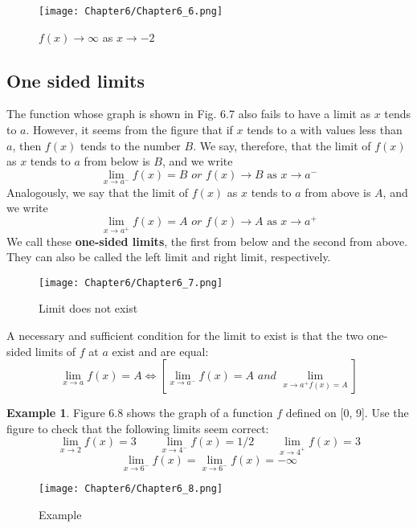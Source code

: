 \documentclass[10pt,a4paper]{book}
\theoremstyle{definition}\newtheorem{definition}{Definition}
\theoremstyle{definition}\newtheorem{fact}{Fact}
\theoremstyle{definition}\newtheorem{ex}{Ex.}
\theoremstyle{definition}\newtheorem{project}{Project}
\theoremstyle{definition}\newtheorem{problem}{Problem}
\theoremstyle{definition}\newtheorem{example}{Example}
\numberwithin{theorem}{chapter}
\numberwithin{corollary}{chapter}
\numberwithin{assumption}{chapter}
\numberwithin{definition}{chapter}
\numberwithin{prop}{chapter}
\numberwithin{notation}{chapter}
\numberwithin{problem}{chapter}
\numberwithin{example}{chapter}
\numberwithin{fact}{chapter}
\numberwithin{ex}{chapter}
\begin{document}
	\begin{figure}[H]
		\centering
		\texttt{[image: Chapter6/Chapter6\_6.png]}
		\caption{$f(x) \rightarrow \infty$ as $x \rightarrow -2$}
	\end{figure}
	
	\subsection{One sided limits}
	The function whose graph is shown in Fig. 6.7 also fails to have a limit as $x$ tends to $a$. However, it seems from the figure that if $x$ tends to a with values less than $a$, then $f (x)$ tends to the number $B$. We say, therefore, that the limit of $f (x)$ as $x$ tends to $a$ from below is $B$, and we write
	$$\lim_{x \rightarrow a^{-}} f(x) = B \,\,or\,\, f(x) \rightarrow B \text{ as } x \rightarrow a^{-}$$
	Analogously, we say that the limit of $f (x)$ as $x$ tends to $a$ from
	above is $A$, and we write
	$$\lim_{x \rightarrow a^{+}} f(x) = A \,\,or\,\, f(x) \rightarrow A \text{ as } x \rightarrow a^{+}$$
	We call these \textbf{one-sided limits}, the first from below and the second from above. They can also be called the left limit and right limit, respectively.
	\begin{figure}[H]
		\centering
		\texttt{[image: Chapter6/Chapter6\_7.png]}
		\caption{Limit does not exist}
	\end{figure}
	
	A necessary and sufficient condition for the limit to exist is that the two one-sided limits of $f$ at $a$ exist and are equal:
	$$\lim_{x \rightarrow a} f(x) = A \Longleftrightarrow \left[ \lim_{x \rightarrow a^{-}}f(x) = A \,\,and\,\, \lim_{x \rightarrow a^{+} f(x) = A} \right]$$
	
	\begin{example}
		Figure 6.8 shows the graph of a function $f$ defined on [0, 9]. Use the figure to check that the following limits seem correct:
		\begin{equation*}
			\lim_{x\rightarrow 2}f(x) = 3 \qquad
			\lim_{x\rightarrow 4^{-}}f(x) = 1/2 \qquad
			\lim_{x\rightarrow 4^{+}}f(x) = 3
		\end{equation*}
		$$\lim_{x\rightarrow 6^{-}}f(x) = \lim_{x\rightarrow 6^{-}}f(x) = -\infty$$
	\end{example}
	\begin{figure}[H]
		\centering
		\texttt{[image: Chapter6/Chapter6\_8.png]}
		\caption{Example}
	\end{figure}
	
\end{document}
